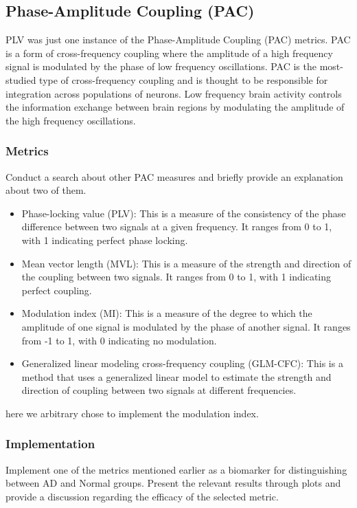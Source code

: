 \documentclass[12pt]{article}
\begin{document}
\subsection{Phase-Amplitude Coupling (PAC)}
PLV was just one instance of the Phase-Amplitude Coupling (PAC) metrics. PAC is a form of cross-frequency coupling where the amplitude of a high frequency signal is modulated by the phase of low frequency oscillations. PAC is the most-studied type of cross-frequency coupling and is thought to be responsible for integration across populations of neurons. Low frequency brain activity controls the information exchange between brain regions by modulating the amplitude of the high frequency oscillations.\cite{PAC-nature}



\subsubsection{Metrics}
Conduct a search about other PAC measures and briefly provide an explanation about two of them.

\begin{qsolve}[]
	\begin{itemize}
		\item Phase-locking value (PLV): This is a measure of the consistency of the phase difference between two signals at a given frequency. It ranges from 0 to 1, with 1 indicating perfect phase locking.
		\item Mean vector length (MVL): This is a measure of the strength and direction of the coupling between two signals. It ranges from 0 to 1, with 1 indicating perfect coupling.
		\item Modulation index (MI): This is a measure of the degree to which the amplitude of one signal is modulated by the phase of another signal. It ranges from -1 to 1, with 0 indicating no modulation.
		\item Generalized linear modeling cross-frequency coupling (GLM-CFC): This is a method that uses a generalized linear model to estimate the strength and direction of coupling between two signals at different frequencies.
	\end{itemize}\cite{10.3389/fnins.2019.00573}
	here we arbitrary chose to implement the modulation index.
\end{qsolve}
\subsubsection{Implementation}
Implement one of the metrics mentioned earlier as a biomarker for distinguishing between AD and Normal groups. Present the relevant results through plots and provide a discussion regarding the efficacy of the selected metric.
\\
\end{document}
